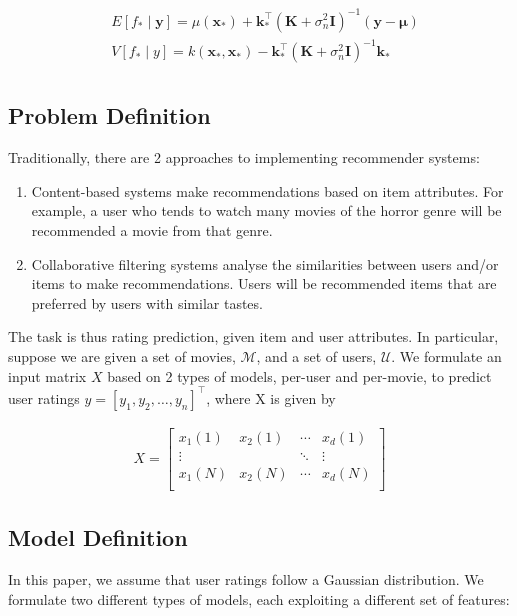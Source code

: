 \documentclass[letterpaper]{article}
\begin{document}
\begin{align*}
	&E[f_* \mid \textbf{y}] = \mu(\textbf{x}_*) + \textbf{k}_*^\top (\textbf{K} + \sigma_n^2 \textbf{I})^{-1} (\textbf{y} - \boldsymbol{\mu}) \\
	&V[f_* \mid y] = k(\textbf{x}_*, \textbf{x}_*) - \textbf{k}_*^\top (\textbf{K} + \sigma_n^2 \textbf{I})^{-1} \textbf{k}_* \\
\end{align*}

\subsection{Problem Definition}
Traditionally, there are 2 approaches to implementing recommender systems:

\begin{enumerate}
	\item Content-based systems make recommendations based on item attributes. For example, a user who tends to watch many movies of the horror genre will be recommended a movie from that genre.
	\item Collaborative filtering systems analyse the similarities between users and/or items to make recommendations. Users will be recommended items that are preferred by users with similar tastes.
\end{enumerate}

The task is thus rating prediction, given item and user attributes. In particular, suppose we are given a set of movies, $\mathcal{M}$, and a set of users, $\mathcal{U}$. We formulate an input matrix $X$ based on 2 types of models, per-user and per-movie, to predict user ratings $y = [y_1, y_2, \ldots, y_n]^\top$, where X is given by

\begin{align*}
	X = \begin{bmatrix}
	x_1(1) & x_2(1) & \cdots & x_d(1)\\
	\vdots & & \ddots & \vdots \\
	x_1(N) & x_2(N) & \cdots & x_d(N) \\
	\end{bmatrix}
\end{align*}
\subsection{Model Definition}
In this paper, we assume that user ratings follow a Gaussian distribution. We formulate two different types of models, each exploiting a different set of features:
\end{document}
